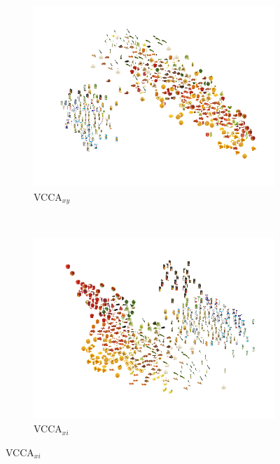 \begin{figure}[t]
     \begin{subfigure}[b]{0.3\textwidth}
         \centering
         \includegraphics[width=\textwidth]{figures_and_tables/latent_space_visualizations/pca_latents_vcca_xy_seed2.png}
         \caption{VCCA$_{x y}$}
         \label{fig:pca_vcca_xy}
     \end{subfigure} \\
     \begin{subfigure}[b]{0.3\textwidth}
         \centering
         \includegraphics[width=\textwidth]{figures_and_tables/latent_space_visualizations/pca_latents_vcca_xi_seed2.png}
         \caption{VCCA$_{x i}$}
         \label{fig:pca_vcca_xi}
     \end{subfigure} 

\end{figure}
